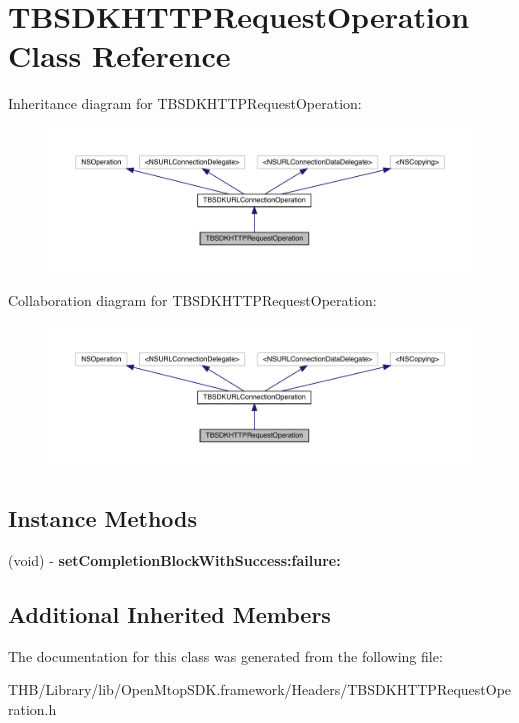 \hypertarget{interface_t_b_s_d_k_h_t_t_p_request_operation}{}\section{T\+B\+S\+D\+K\+H\+T\+T\+P\+Request\+Operation Class Reference}
\label{interface_t_b_s_d_k_h_t_t_p_request_operation}


Inheritance diagram for T\+B\+S\+D\+K\+H\+T\+T\+P\+Request\+Operation\+:\nopagebreak
\begin{figure}[H]
\begin{center}
\leavevmode
\includegraphics[width=350pt]{interface_t_b_s_d_k_h_t_t_p_request_operation__inherit__graph}
\end{center}
\end{figure}


Collaboration diagram for T\+B\+S\+D\+K\+H\+T\+T\+P\+Request\+Operation\+:\nopagebreak
\begin{figure}[H]
\begin{center}
\leavevmode
\includegraphics[width=350pt]{interface_t_b_s_d_k_h_t_t_p_request_operation__coll__graph}
\end{center}
\end{figure}
\subsection*{Instance Methods}
\begin{DoxyCompactItemize}
\item 
\mbox{\label{interface_t_b_s_d_k_h_t_t_p_request_operation_a36ae642919d18baf7b9df3d03cf36bac}} 
(void) -\/ {\bfseries set\+Completion\+Block\+With\+Success\+:failure\+:}
\end{DoxyCompactItemize}
\subsection*{Additional Inherited Members}


The documentation for this class was generated from the following file\+:\begin{DoxyCompactItemize}
\item 
T\+H\+B/\+Library/lib/\+Open\+Mtop\+S\+D\+K.\+framework/\+Headers/T\+B\+S\+D\+K\+H\+T\+T\+P\+Request\+Operation.\+h\end{DoxyCompactItemize}
